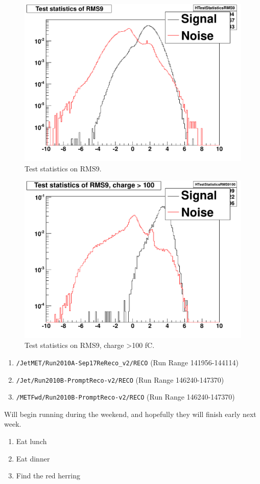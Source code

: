 \begin{figure}
\includegraphics[width=120mm]{DailyLog/6275/6275HTestStatisticsRMS9.pdf}
\caption{Test statistics on RMS9.}
\label{Figure_6275HTestStatisticsRMS9}
\end{figure}

\begin{figure}
\includegraphics[width=120mm]{DailyLog/6275/6275HTestStatisticsRMS9100.pdf}
\caption{Test statistics on RMS9, charge \textgreater 100 fC.}
\label{Figure_6275HTestStatisticsRMS9100}
\end{figure}


\begin{enumerate}
\item \texttt{/JetMET/Run2010A-Sep17ReReco\_v2/RECO}         (Run Range 141956-144114)
\item \texttt{/Jet/Run2010B-PromptReco-v2/RECO}                   (Run Range 146240-147370)
\item \texttt{/METFwd/Run2010B-PromptReco-v2/RECO}          (Run Range 146240-147370)
\end{enumerate}

Will begin running during the weekend, and hopefully they will finish early next week.




\begin{enumerate}
\item Eat lunch
\item Eat dinner
\item Find the red herring
\end{enumerate}


